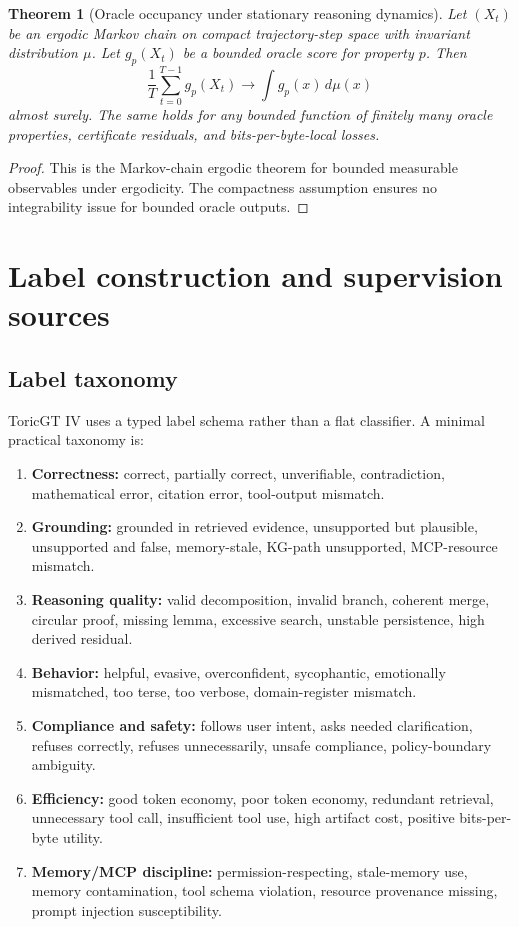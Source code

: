 \documentclass[11pt]{article}
\newtheorem{theorem}{Theorem}[section]
\numberwithin{equation}{section}
\begin{document}
\begin{theorem}[Oracle occupancy under stationary reasoning dynamics]
Let $(X_t)$ be an ergodic Markov chain on compact trajectory-step space with invariant distribution $\mu$. Let $g_p(X_t)$ be a bounded oracle score for property $p$. Then
\begin{equation}
\frac1T\sum_{t=0}^{T-1}g_p(X_t)\to \int g_p(x)\,d\mu(x)
\end{equation}
almost surely. The same holds for any bounded function of finitely many oracle properties, certificate residuals, and bits-per-byte-local losses.
\end{theorem}
\begin{proof}
This is the Markov-chain ergodic theorem for bounded measurable observables under ergodicity. The compactness assumption ensures no integrability issue for bounded oracle outputs.
\end{proof}

\section{Label construction and supervision sources}
\subsection{Label taxonomy}
ToricGT IV uses a typed label schema rather than a flat classifier. A minimal practical taxonomy is:
\begin{enumerate}
\item \textbf{Correctness:} correct, partially correct, unverifiable, contradiction, mathematical error, citation error, tool-output mismatch.
\item \textbf{Grounding:} grounded in retrieved evidence, unsupported but plausible, unsupported and false, memory-stale, KG-path unsupported, MCP-resource mismatch.
\item \textbf{Reasoning quality:} valid decomposition, invalid branch, coherent merge, circular proof, missing lemma, excessive search, unstable persistence, high derived residual.
\item \textbf{Behavior:} helpful, evasive, overconfident, sycophantic, emotionally mismatched, too terse, too verbose, domain-register mismatch.
\item \textbf{Compliance and safety:} follows user intent, asks needed clarification, refuses correctly, refuses unnecessarily, unsafe compliance, policy-boundary ambiguity.
\item \textbf{Efficiency:} good token economy, poor token economy, redundant retrieval, unnecessary tool call, insufficient tool use, high artifact cost, positive bits-per-byte utility.
\item \textbf{Memory/MCP discipline:} permission-respecting, stale-memory use, memory contamination, tool schema violation, resource provenance missing, prompt injection susceptibility.
\end{enumerate}
\end{document}

